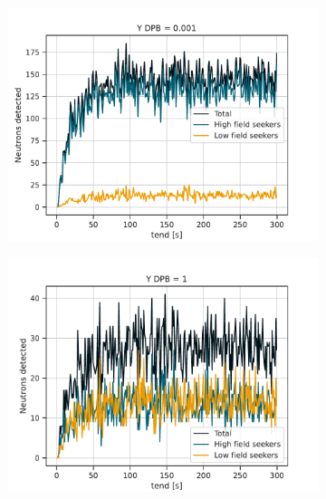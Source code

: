 \begin{figure}
\centering
\begin{subfigure}{.5\textwidth}
  \centering
  \includegraphics[width=\textwidth]{figures/flow_through_dpb_0.001.pdf}
  \caption{}\label{subfig:dpb_001}
\end{subfigure}%
\begin{subfigure}{.5\textwidth}
  \centering
  \includegraphics[width=\textwidth]{figures/flow_through_dpb_1.pdf}
  \caption{}\label{subfig:dpb_1}
\end{subfigure}
\begin{subfigure}{.5\textwidth}
  \centering

\end{subfigure}
\end{figure}

